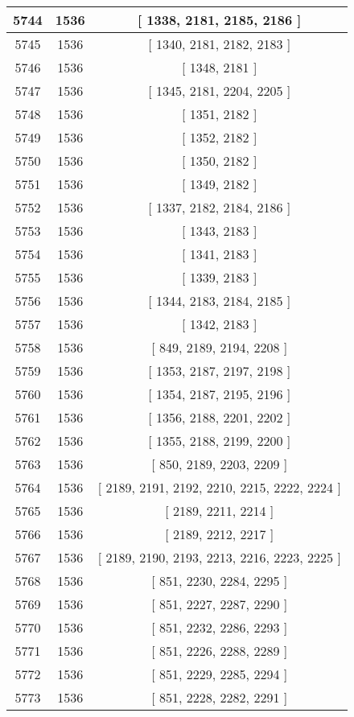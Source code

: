 \begin{center}
\begin{longtable}[H]{|| c c c ||}
\hline
5744 & 1536 & [ 1338, 2181, 2185, 2186 ] \\ 
\hline
5745 & 1536 & [ 1340, 2181, 2182, 2183 ] \\ 
\hline
5746 & 1536 & [ 1348, 2181 ] \\ 
\hline
5747 & 1536 & [ 1345, 2181, 2204, 2205 ] \\ 
\hline
5748 & 1536 & [ 1351, 2182 ] \\ 
\hline
5749 & 1536 & [ 1352, 2182 ] \\ 
\hline
5750 & 1536 & [ 1350, 2182 ] \\ 
\hline
5751 & 1536 & [ 1349, 2182 ] \\ 
\hline
5752 & 1536 & [ 1337, 2182, 2184, 2186 ] \\ 
\hline
5753 & 1536 & [ 1343, 2183 ] \\ 
\hline
5754 & 1536 & [ 1341, 2183 ] \\ 
\hline
5755 & 1536 & [ 1339, 2183 ] \\ 
\hline
5756 & 1536 & [ 1344, 2183, 2184, 2185 ] \\ 
\hline
5757 & 1536 & [ 1342, 2183 ] \\ 
\hline
5758 & 1536 & [ 849, 2189, 2194, 2208 ] \\ 
\hline
5759 & 1536 & [ 1353, 2187, 2197, 2198 ] \\ 
\hline
5760 & 1536 & [ 1354, 2187, 2195, 2196 ] \\ 
\hline
5761 & 1536 & [ 1356, 2188, 2201, 2202 ] \\ 
\hline
5762 & 1536 & [ 1355, 2188, 2199, 2200 ] \\ 
\hline
5763 & 1536 & [ 850, 2189, 2203, 2209 ] \\ 
\hline
5764 & 1536 & [ 2189, 2191, 2192, 2210, 2215, 2222, 2224 ] \\ 
\hline
5765 & 1536 & [ 2189, 2211, 2214 ] \\ 
\hline
5766 & 1536 & [ 2189, 2212, 2217 ] \\ 
\hline
5767 & 1536 & [ 2189, 2190, 2193, 2213, 2216, 2223, 2225 ] \\ 
\hline
5768 & 1536 & [ 851, 2230, 2284, 2295 ] \\ 
\hline
5769 & 1536 & [ 851, 2227, 2287, 2290 ] \\ 
\hline
5770 & 1536 & [ 851, 2232, 2286, 2293 ] \\ 
\hline
5771 & 1536 & [ 851, 2226, 2288, 2289 ] \\ 
\hline
5772 & 1536 & [ 851, 2229, 2285, 2294 ] \\ 
\hline
5773 & 1536 & [ 851, 2228, 2282, 2291 ] \\ 

\end{longtable}
\end{center}
